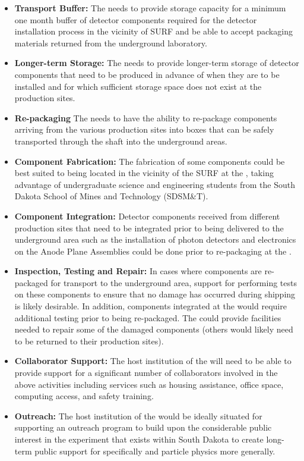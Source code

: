 \begin{itemize}
  \item {\bf Transport Buffer:} The  needs to provide
    storage capacity for a minimum one month buffer of detector
    components required for the detector installation process in the
    vicinity of SURF and be able to accept packaging materials
    returned from the underground laboratory.
  \item {\bf Longer-term Storage:} The  needs to provide
    longer-term storage of detector components that need to be
    produced in advance of when they are to be installed and for which
    sufficient storage space does not exist at the production sites.
  \item {\bf Re-packaging} The  needs to have the ability
    to re-package components arriving from the various production
    sites into boxes that can be safely transported through the shaft
    into the underground areas.
  \item {\bf Component Fabrication:} The fabrication of some
    components could be best suited to being located in the vicinity
    of the SURF at the , taking advantage of
    undergraduate science and engineering students from the South
    Dakota School of Mines and Technology (SDSM\&T).
  \item {\bf Component Integration:} Detector components received from 
    different production sites that need to be integrated prior to being 
    delivered to the underground area such as the installation of photon 
    detectors and electronics on the Anode Plane Assemblies could be done
    prior to re-packaging at the .    
  \item {\bf Inspection, Testing and Repair:} In cases where
    components are re-packaged for transport to the underground area,
     support for performing tests on these components to
    ensure that no damage has occurred during shipping is likely
    desirable.  In addition, components integrated at the 
    would require additional testing prior to being re-packaged.  The
     could provide facilities needed to repair some of the
    damaged components (others would likely need to be returned to
    their production sites).
  \item {\bf Collaborator Support:} The host institution of the 
    will need to be able to provide support for a significant number
    of  collaborators involved in the above activities
    including services such as housing assistance, office space,
    computing access, and safety training.
  \item {\bf Outreach:} The host institution of the  would be
    ideally situated for supporting an outreach program to build upon
    the considerable public interest in the experiment that exists
    within South Dakota to create long-term public support for
     specifically and particle physics more generally.
\end{itemize}

